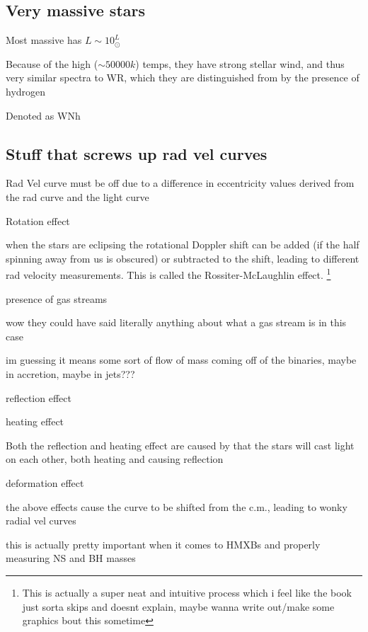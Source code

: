 \documentclass{article}
\begin{document}
\subsection{Very massive stars}
\begin{list}{-}{}
\item Most massive has \(L \sim 10^ L_\odot\)
\item Because of the high (\(\sim50000k\)) temps, they have strong stellar wind, and thus very similar spectra to \gls{WR}, which they are distinguished from by the presence of hydrogen 
\item Denoted as \gls{WNh}
\end{list}

\subsection{Stuff that screws up rad vel curves}
\begin{list}{-}{}
\item Rad Vel curve must be off due to a difference in eccentricity values derived from the rad curve and the light curve
\item Rotation effect
\begin{list}{-}{}
\item when the stars are eclipsing the rotational Doppler shift can be added (if the half spinning away from us is obscured) or subtracted to the shift, leading to different rad velocity measurements. This is called the Rossiter-McLaughlin effect. \footnote{This is actually a super neat and intuitive process which i feel like the book just sorta skips and doesnt explain, maybe wanna write out/make some graphics bout this sometime}
\end{list}
\item presence of gas streams
\begin{list}{-}{}
\item wow they could have said literally anything about what a gas stream is in this case
\item im guessing it means some sort of flow of mass coming off of the binaries, maybe in accretion, maybe in jets???
\end{list}
\item reflection effect
\item heating effect
\begin{list}{-}{}
\item Both the reflection and heating effect are caused by that the stars will cast light on each other, both heating and causing reflection
\end{list}
\item deformation effect
\begin{list}{-}{}
\item the above effects cause the curve to be shifted from the c.m., leading to wonky radial vel curves
\end{list}
\item  this is actually pretty important when it comes to HMXBs and properly measuring NS and BH masses
\end{list}
\end{document}
